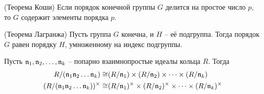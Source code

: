 \documentclass[_00_dissertation.tex]{subfiles}
\begin{document}
\begin{statement}\label{statement:cauchy}(Теорема Коши)
    Если порядок конечной группы $G$ делится на простое число $p$, то $G$ содержит элементы порядка $p$.
\end{statement}

\begin{statement}\label{statement:lagrange}(Теорема Лагранжа)
    Пусть группа $G$ конечна, и $H$ -- её подгруппа.
    Тогда порядок $G$ равен порядку $H$, умноженному на индекс подгруппы.
\end{statement}

\begin{statement}\label{statement:chinese_remainder_theorem}
    Пусть $\mathfrak{n}_1, \mathfrak{n}_2, \dots, \mathfrak{n}_k$ -- попарно взаимнопростые идеалы кольца $R$.
    Тогда
    \begin{equation*}
        \begin{split}
            R/(\mathfrak{n}_1\mathfrak{n}_2\dots\mathfrak{n}_k) \cong & (R/\mathfrak{n}_1) \times (R/\mathfrak{n}_2) \times \dots \times (R/\mathfrak{n}_k)\\
            (R/(\mathfrak{n}_1\mathfrak{n}_2\dots\mathfrak{n}_k))^{\times} \cong & (R/\mathfrak{n}_1)^{\times} \times (R/\mathfrak{n}_2)^{\times} \times \dots \times (R/\mathfrak{n}_k)^{\times}
        \end{split}
    \end{equation*}
\end{statement}

\onlyinsubfile{
    
    
}
\end{document}
